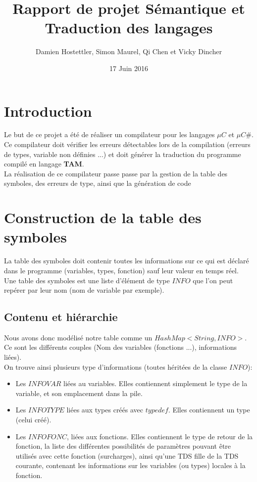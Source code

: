 \documentclass[11pt,a4paper]{report}
\author{Damien Hostettler, Simon Maurel, Qi Chen et Vicky Dincher}
\title{Rapport de projet Sémantique et Traduction des langages}
\date{17 Juin 2016}
\begin{document}
\maketitle
\tableofcontents
\newpage
 
\section*{Introduction}

Le but de ce projet a été de réaliser un compilateur pour les langages $\mu C$ et $\mu C \#$. Ce compilateur doit vérifier les erreurs détectables lors de la compilation (erreurs de types, variable non définies ...) et doit générer la traduction du programme compilé en langage \textbf{TAM}.\\
La réalisation de ce compilateur passe passe par la gestion de la table des symboles, des erreurs de type, ainsi que la génération de code


\section{Construction de la table des symboles}

La table des symboles doit contenir toutes les informations sur ce qui est déclaré dans le programme (variables, types, fonction) sauf leur valeur en temps réel. \\
Une table des symboles est une liste d'élément de type $INFO$ que l'on peut repérer par leur nom (nom de variable par exemple).

\subsection{Contenu et hiérarchie}

Nous avons donc modélisé notre table comme un $HashMap<String,INFO>$.
Ce sont les différents couples (Nom des variables (fonctions ...), informations liées).\\
On trouve ainsi plusieurs type d'informations (toutes héritées de la classe $INFO$): 
\begin{itemize}
\item Les $INFOVAR$ liées au variables. Elles contiennent simplement le type de la variable, et son emplacement dans la pile. 
\item Les $INFOTYPE$ liées aux types créés avec $typedef$. Elles contiennent un type (celui créé). 
\item Les $INFOFONC$, liées aux fonctions. Elles contiennent le type de retour de la fonction, la liste des différentes possibilités de paramètres pouvant être utilisés avec cette fonction (surcharges), ainsi qu'une TDS fille de la TDS courante, contenant les informations sur les variables (ou types) locales à la fonction. 
\end{itemize}
\end{document}
